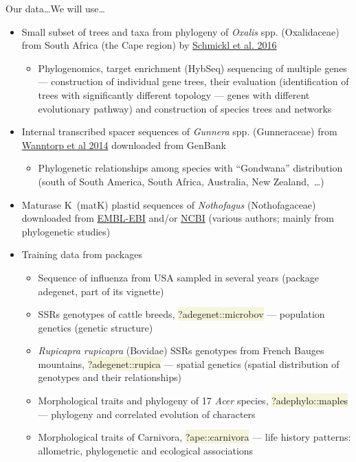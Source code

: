 \documentclass[compress, xelatex, 11pt, xcolor=svgnames, aspectratio=169, url={hyphens, lowtilde}]{beamer}
\renewcommand{\texttt}[1]{\colorbox{Beige}{{\ttfamily #1}}}
\begin{document}
\begin{frame}[allowframebreaks]{Our data\ldots}{We will use\ldots}
\begin{itemize}
\begin{itemize}
			\end{itemize}
			\item Small subset of trees and taxa from phylogeny of \textit{Oxalis} spp. (Oxalidaceae) from South Africa (the Cape region) by \href{https://onlinelibrary.wiley.com/doi/full/10.1111/1755-0998.12487}{Schmickl et al. 2016}
			\begin{itemize}
				\item Phylogenomics, target enrichment (HybSeq) sequencing of multiple genes --- construction of individual gene trees, their evaluation (identification of trees with significantly different topology --- genes with different evolutionary pathway) and construction of species trees and networks
			\end{itemize}
			\item Internal transcribed spacer sequences of \textit{Gunnera} spp. (Gunneraceae) from \href{https://doi.org/10.1046/j.1365-2699.2003.00895.x}{Wanntorp et al 2014} downloaded from GenBank
			\begin{itemize}
				\item Phylogenetic relationships among species with \enquote{Gondwana} distribution (south of South America, South Africa, Australia, New Zealand,~\ldots)
			\end{itemize}
			\item Maturase K~(matK) plastid sequences of \textit{Nothofagus} (Nothofagaceae) downloaded from \href{https://www.ebi.ac.uk/}{EMBL-EBI} and/or \href{https://www.ncbi.nlm.nih.gov/}{NCBI} (various authors; mainly from phylogenetic studies)
			\item Training data from packages
			\begin{itemize}
				\item Sequence of influenza from USA sampled in several years (package adegenet, part of its vignette)
				\item SSRs genotypes of cattle breeds, \texttt{?adegenet::microbov} --- population genetics (genetic structure)
				\item \textit{Rupicapra rupicapra} (Bovidae) SSRs genotypes from French Bauges mountains, \texttt{?adegenet::rupica} --- spatial genetics (spatial distribution of genotypes and their relationships)
				\item Morphological traits and phylogeny of 17 \textit{Acer} species, \texttt{?adephylo::maples} --- phylogeny and correlated evolution of characters
				\item Morphological traits of Carnivora, \texttt{?ape::carnivora} --- life history patterns: allometric, phylogenetic and ecological associations

\end{itemize}
\end{itemize}
\end{frame}
\end{document}
